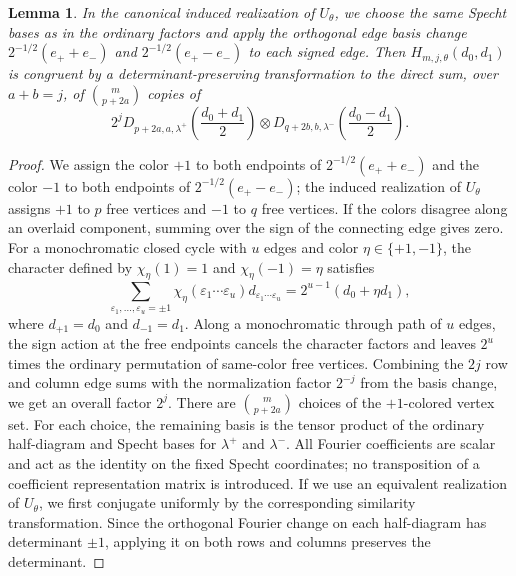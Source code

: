 \documentclass[11pt,a4paper]{amsart}
\newtheorem{lemma}[theorem]{Lemma}
\theoremstyle{uprightdefinition}
\theoremstyle{remark}\newtheorem{remark}[theorem]{Remark}
\begin{document}
\begin{lemma}\label{lem:fourier-gram}
In the canonical induced realization of $U_\theta$, we choose the same Specht
bases as in the ordinary factors and apply the orthogonal edge basis change
$2^{-1/2}(e_++e_-)$ and $2^{-1/2}(e_+-e_-)$ to each signed edge.
Then $H_{m,j,\theta}(d_0,d_1)$ is congruent by a determinant-preserving transformation to the direct sum, over $a+b=j$, of
$\binom m{p+2a}$ copies of
\[
 2^j D_{p+2a,a,\lambda^+}\left(\frac{d_0+d_1}{2}\right)
       \otimes
       D_{q+2b,b,\lambda^-}\left(\frac{d_0-d_1}{2}\right).
\]
\end{lemma}
\begin{proof}
We assign the color $+1$ to both endpoints of $2^{-1/2}(e_++e_-)$ and the color $-1$ to both endpoints of $2^{-1/2}(e_+-e_-)$; the induced realization of $U_\theta$
assigns $+1$ to $p$ free vertices and $-1$ to $q$ free vertices.
If the colors disagree along an overlaid component, summing over the sign of the connecting edge gives zero.
For a monochromatic closed cycle with $u$ edges and color $\eta\in\{+1,-1\}$,
the character defined by $\chi_\eta(1)=1$ and
$\chi_\eta(-1)=\eta$ satisfies
\[
 \sum_{\varepsilon_1,\ldots,\varepsilon_u=\pm1}
 \chi_\eta(\varepsilon_1\cdots\varepsilon_u)
 d_{\varepsilon_1\cdots\varepsilon_u}
 =2^{u-1}(d_0+\eta d_1),
\]
where $d_{+1}=d_0$ and $d_{-1}=d_1$. Along a monochromatic through path of $u$ edges, the sign action at the free endpoints
cancels the character factors and leaves $2^u$ times the ordinary
permutation of same-color free vertices. Combining the $2j$ row and column edge sums with the normalization factor $2^{-j}$ from the basis change,
we get an overall factor $2^j$.
There are $\binom m{p+2a}$ choices of the $+1$-colored vertex set.
For each choice, the remaining basis is the tensor product of the ordinary
half-diagram and Specht bases for $\lambda^+$ and $\lambda^-$.
All Fourier coefficients are scalar and act as the identity on the
fixed Specht coordinates; no transposition of a coefficient representation
matrix is introduced. If we use an equivalent realization of $U_\theta$, we first conjugate uniformly by the corresponding similarity transformation. Since the orthogonal Fourier change on each half-diagram has
determinant $\pm1$, applying it on both rows and columns preserves the determinant.
\end{proof}
\end{document}
